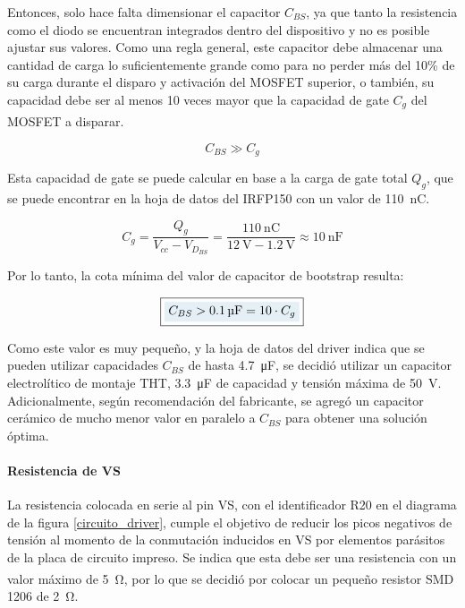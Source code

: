 Entonces, solo hace falta dimensionar el capacitor $C_{BS}$, ya que tanto la resistencia como el diodo se encuentran integrados dentro del dispositivo y no es posible ajustar sus valores. Como una regla general, este capacitor debe almacenar una cantidad de carga lo suficientemente grande como para no perder más del 10\% de su carga durante el disparo y activación del MOSFET superior, o también, su capacidad debe ser al menos 10 veces mayor que la capacidad de gate $C_g$ del MOSFET a disparar.\textsuperscript{\cite{Bootstrap}}

\begin{equation*}
    C_{BS} \gg C_g
\end{equation*}

Esta capacidad de gate se puede calcular en base a la carga de gate total $Q_g$, que se puede encontrar en la hoja de datos del IRFP150 con un valor de \SI[]{110}{\nano\coulomb}.

\begin{equation}\label{capacidad_gate}
    C_g = \frac{Q_g}{V_{cc}-V_{D_{BS}}} = \frac{\SI[]{110}{\nano\coulomb}}{\SI[]{12}{\volt}-\SI[]{1.2}{\volt}} \approx \SI[]{10}{\nano\farad}
\end{equation}

Por lo tanto, la cota mínima del valor de capacitor de bootstrap resulta:

\begin{equation}\label{capacidad_bs_min}
    \boxed{\highlight{
    C_{BS} > \SI[]{0.1}{\micro\farad} = 10\cdot C_g}}
\end{equation}

Como este valor es muy pequeño, y la hoja de datos del driver indica que se pueden utilizar capacidades $C_{BS}$ de hasta \SI[]{4.7}{\micro\farad}, se decidió utilizar un capacitor electrolítico de montaje THT, \SI[]{3.3}{\micro\farad} de capacidad y tensión máxima de \SI[]{50}{\volt}. Adicionalmente, según recomendación del fabricante, se agregó un capacitor cerámico de mucho menor valor en paralelo a $C_{BS}$ para obtener una solución óptima.\\

\paragraph{Resistencia de VS}

La resistencia colocada en serie al pin VS, con el identificador R20 en el diagrama de la figura \ref{circuito_driver}, cumple el objetivo de reducir los picos negativos de tensión al momento de la conmutación inducidos en VS por elementos parásitos de la placa de circuito impreso. Se indica que esta debe ser una resistencia con un valor máximo de \SI[]{5}{\ohm}\textsuperscript{\cite{DatasheetDriver}}, por lo que se decidió por colocar un pequeño resistor SMD 1206 de \SI[]{2}{\ohm}.\\